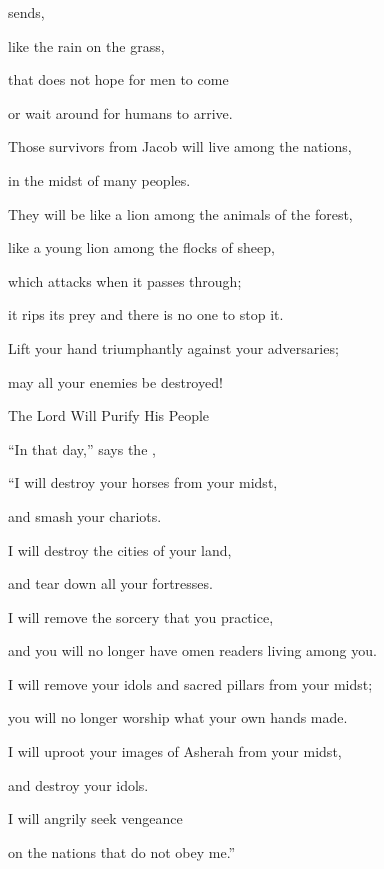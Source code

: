 {{}
sends,
\par }{\Q like the rain
on
the grass,
\par }{\Q that
does not
hope
for men
to come
\par }{\Q or
wait
around for humans to arrive.
\par }{\Q {}Those survivors
from Jacob
will live among the nations,
\par }{\Q in the midst
of many
peoples.
\par }{\Q They will be
like a lion
among the animals
of the forest,
\par }{\Q like a young lion
among the flocks
of sheep,
\par }{\Q which
attacks when it
passes
through;
\par }{\Q it
rips
its prey and there is no
one to stop it.
\par }{\Q {}Lift
your hand
triumphantly
against your adversaries;
\par }{\Q may all
your enemies
be destroyed!
\par }{\SH The Lord Will Purify His People
\par }{\Q {}“In that
day,”
says
the {},
\par }{\Q “I will destroy
your horses
from your midst,
\par }{\Q and smash
your chariots.
\par }{\Q {}I will destroy
the cities
of your land,
\par }{\Q and tear
down all
your fortresses.
\par }{\Q {}I will remove the sorcery
that you practice,
\par }{\Q and you will no
longer have omen readers living among you.
\par }{\Q {}I will remove
your idols
and sacred pillars
from your midst;
\par }{\Q you will no
longer
worship
what your own hands
made.
\par }{\Q {}I will uproot
your images of Asherah
from your midst,
\par }{\Q and destroy
your idols.
\par }{\Q {}I will angrily
seek vengeance
\par }{\Q on the nations
that
do not
obey me.”

\par }
